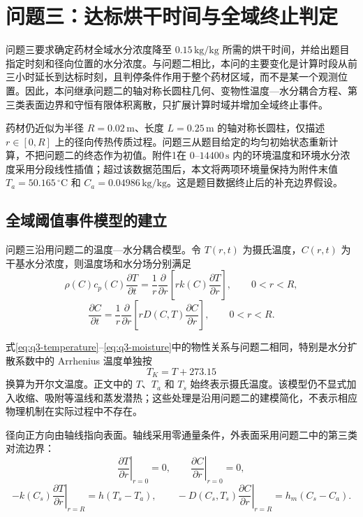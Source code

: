 \section{问题三：达标烘干时间与全域终止判定}

问题三要求确定药材全域水分浓度降至 $0.15\,\mathrm{kg/kg}$ 所需的烘干时间，并给出题目指定时刻和径向位置的水分浓度。与问题二相比，本问的主要变化是计算时段从前三小时延长到达标时刻，且判停条件作用于整个药材区域，而不是某一个观测位置。因此，本问继承问题二的轴对称长圆柱几何、变物性温度—水分耦合方程、第三类表面边界和守恒有限体积离散，只扩展计算时域并增加全域终止事件。

药材仍近似为半径 $R=0.02\,\mathrm{m}$、长度 $L=0.25\,\mathrm{m}$ 的轴对称长圆柱，仅描述 $r\in[0,R]$ 上的径向传热传质过程。问题三从题目给定的均匀初始状态重新计算，不把问题二的终态作为初值。附件1在 $0$--$14400\,\mathrm{s}$ 内的环境温度和环境水分浓度采用分段线性插值；超过该数据范围后，本文将两项环境量保持为附件末值 $T_a=50.165\,{}^\circ\mathrm{C}$ 和 $C_a=0.04986\,\mathrm{kg/kg}$。这是题目数据终止后的补充边界假设。

\subsection{全域阈值事件模型的建立}

问题三沿用问题二的温度—水分耦合模型。令 $T(r,t)$ 为摄氏温度，$C(r,t)$ 为干基水分浓度，则温度场和水分场分别满足
\begin{equation}
\rho(C)c_p(C)\frac{\partial T}{\partial t}
=\frac{1}{r}\frac{\partial}{\partial r}
\left[rk(C)\frac{\partial T}{\partial r}\right],
\qquad 0<r<R,
\label{eq:q3-temperature}
\end{equation}
\begin{equation}
\frac{\partial C}{\partial t}
=\frac{1}{r}\frac{\partial}{\partial r}
\left[rD(C,T)\frac{\partial C}{\partial r}\right],
\qquad 0<r<R.
\label{eq:q3-moisture}
\end{equation}

式\eqref{eq:q3-temperature}--\eqref{eq:q3-moisture}中的物性关系与问题二相同，特别是水分扩散系数中的 Arrhenius 温度单独按
\begin{equation}
T_K=T+273.15
\label{eq:q3-kelvin}
\end{equation}
换算为开尔文温度。正文中的 $T$、$T_a$ 和 $T_s$ 始终表示摄氏温度。该模型仍不显式加入收缩、吸附等温线和蒸发潜热；这些处理是沿用问题二的建模简化，不表示相应物理机制在实际过程中不存在。

径向正方向由轴线指向表面。轴线采用零通量条件，外表面采用问题二中的第三类对流边界：
\begin{equation}
\left.\frac{\partial T}{\partial r}\right|_{r=0}=0,
\qquad
\left.\frac{\partial C}{\partial r}\right|_{r=0}=0,
\label{eq:q3-center-bc}
\end{equation}
\begin{equation}
-k(C_s)\left.\frac{\partial T}{\partial r}\right|_{r=R}
=h(T_s-T_a),
\qquad
-D(C_s,T_s)\left.\frac{\partial C}{\partial r}\right|_{r=R}
=h_m(C_s-C_a).
\label{eq:q3-surface-bc}
\end{equation}

